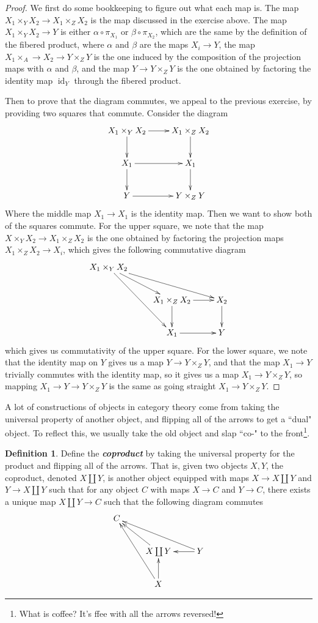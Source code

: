 \documentclass[psamsfonts]{amsart}
\theoremstyle{definition}
\newtheorem{defn}[thm]{Definition}
\theoremstyle{remark}
\newcommand{\ib}[1]{\textbf{\textit{#1}}}
\DeclareMathOperator{\id}{id}
\begin{document}
\begin{proof}
We first do some bookkeeping to figure out what each map is. The map $X_1 \times_Y X_2 \to X_1 \times_Z X_2$ is the map discussed in the exercise above. The map $X_1 \times_Y X_2 \to Y$ is either $\alpha \circ \pi_{X_1}$ or $\beta \circ \pi_{X_2}$, which are the same by the definition of the fibered product, where $\alpha$ and $\beta$ are the maps $X_i \to Y$, the map $X_1 \times_A \to X_2 \to Y \times_Z Y$ is the one induced by the composition of the projection maps with $\alpha$ and  $\beta$, and the map $Y \to Y \times_Z Y$ is the one obtained by factoring the identity map $\id_Y$ through the fibered product.

Then to prove that the diagram commutes, we appeal to the previous exercise, by providing two squares that commute. Consider the diagram
$$\xymatrix{
X_1 \times_Y X_2 \ar[r] \ar[d] & X_1 \times_Z X_2 \ar[d] \\
X_1 \ar[d] \ar[r] & X_1 \ar[d] \\
Y \ar[r] & Y \times_Z Y
}$$
Where the middle map $X_1 \to X_1$ is the identity map. Then we want to show both of the squares commute. For the upper square, we note that the map $X \times_Y X_2 \to X_1 \times_Z X_2$ is the one obtained by factoring the projection maps $X_1 \times_Z X_2 \to X_i$, which gives the following commutative diagram
$$\xymatrix{
X_1 \times_Y X_2  \ar[dr] \ar[drr] \ar[ddr]\\
& X_1 \times_Z X_2 \ar[r] \ar[d] & X_2 \ar[d]\\
& X_1 \ar[r] & Y
}$$ 
which gives us commutativity of the upper square. For the lower square, we note that the identity map on $Y$ gives us a map $Y \to Y \times_Z Y$, and that the map $X_1 \to Y$ trivially commutes with the identity map, so it gives us a map $X_1 \to Y \times_Z Y$, so mapping $X_1 \to Y \to Y\times_Z Y$ is the same as going straight $X_1 \to Y \times_Z Y$.
\end{proof}
A lot of constructions of objects in category theory come from taking the universal property of another object, and flipping all of the arrows to get a ``dual" object. To reflect this, we usually take the old object and slap ``co-" to the front\footnote{What is coffee? It's ffee with all the arrows reversed!}.
\begin{defn}
Define the \ib{coproduct} by taking the universal property for the product and flipping all of the arrows. That is, given two objects $X,Y$, the coproduct, denoted $X \coprod Y$, is another object equipped with maps $X \to X \coprod Y$ and $Y \to X \coprod Y$ such that for any object $C$ with maps $X \to C$ and $Y \to C$, there exists a unique map $X \coprod Y \to C$ such that the following diagram commutes
$$\xymatrix{
C \\
& X \coprod Y \ar[ul] & Y \ar[l] \ar[ull] \\
& X \ar[u] \ar[uul]
}$$
\end{defn}
\end{document}
